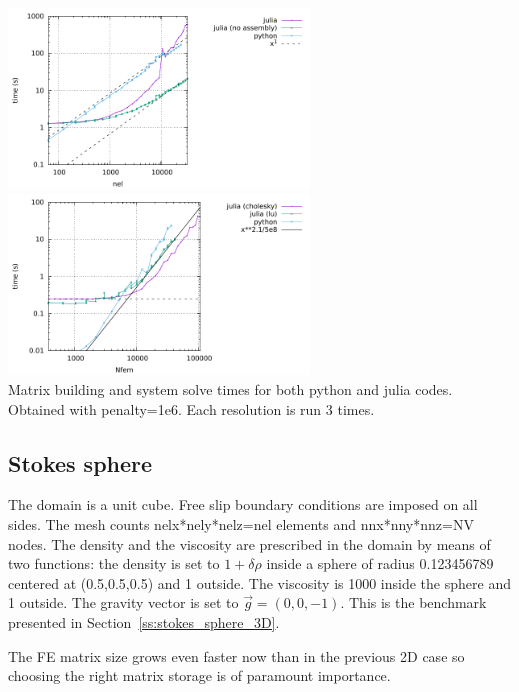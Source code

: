 \begin{center}
\includegraphics[width=8cm]{python_codes/fieldstone_10/results/exp5/julia/build.pdf}
\includegraphics[width=8cm]{python_codes/fieldstone_10/results/exp5/julia/solve.pdf}\\
{\captionfont Matrix building and system solve times for both python and julia codes.
Obtained with penalty=1e6. Each resolution is run 3 times.}
\end{center}



\subsection*{Stokes sphere}

The domain is a unit cube. Free slip boundary conditions 
are imposed on all sides. The mesh counts 
nelx*nely*nelz=nel elements and 
nnx*nny*nnz=NV nodes.
The density and the viscosity are prescribed in the domain 
by means of two functions:
the density is set to $1+\delta \rho$ inside a sphere of radius 0.123456789 centered 
at (0.5,0.5,0.5) and 1 outside. The viscosity is 1000 inside the sphere
and 1 outside.  The gravity vector is set to $\vec{g}=(0,0,-1)$.
This is the benchmark presented in Section~\ref{ss:stokes_sphere_3D}.

The FE matrix size grows even faster now than in the previous 2D case so
choosing the right matrix storage is of paramount importance. 

